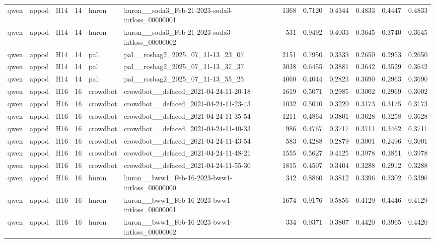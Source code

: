 \begin{table}[tbp]
\begin{tabular}{lllrllrrrrrr}
qwen & appod & H14 & 14 & huron & huron\_\_soda3\_Feb-21-2023-soda3-intloss\_00000001 & 1368 & 0.7120 & 0.4344 & 0.4833 & 0.4447 & 0.4833 \\
qwen & appod & H14 & 14 & huron & huron\_\_soda3\_Feb-21-2023-soda3-intloss\_00000002 & 531 & 0.9492 & 0.4033 & 0.3645 & 0.3740 & 0.3645 \\
qwen & appod & H14 & 14 & pal & pal\_\_rosbag2\_2025\_07\_11-13\_23\_07 & 2151 & 0.7950 & 0.3333 & 0.2650 & 0.2953 & 0.2650 \\
qwen & appod & H14 & 14 & pal & pal\_\_rosbag2\_2025\_07\_11-13\_37\_37 & 3038 & 0.6455 & 0.3881 & 0.3642 & 0.3529 & 0.3642 \\
qwen & appod & H14 & 14 & pal & pal\_\_rosbag2\_2025\_07\_11-13\_55\_25 & 4060 & 0.4044 & 0.2823 & 0.3690 & 0.2963 & 0.3690 \\
qwen & appod & H16 & 16 & crowdbot & crowdbot\_\_defaced\_2021-04-24-11-20-18 & 1619 & 0.5071 & 0.2985 & 0.3002 & 0.2969 & 0.3002 \\
qwen & appod & H16 & 16 & crowdbot & crowdbot\_\_defaced\_2021-04-24-11-23-43 & 1032 & 0.5010 & 0.3220 & 0.3173 & 0.3175 & 0.3173 \\
qwen & appod & H16 & 16 & crowdbot & crowdbot\_\_defaced\_2021-04-24-11-35-54 & 1211 & 0.4864 & 0.3801 & 0.3628 & 0.3258 & 0.3628 \\
qwen & appod & H16 & 16 & crowdbot & crowdbot\_\_defaced\_2021-04-24-11-40-33 & 986 & 0.4767 & 0.3717 & 0.3711 & 0.3462 & 0.3711 \\
qwen & appod & H16 & 16 & crowdbot & crowdbot\_\_defaced\_2021-04-24-11-43-54 & 583 & 0.4288 & 0.2879 & 0.3001 & 0.2496 & 0.3001 \\
qwen & appod & H16 & 16 & crowdbot & crowdbot\_\_defaced\_2021-04-24-11-48-21 & 1555 & 0.5627 & 0.4125 & 0.3978 & 0.3851 & 0.3978 \\
qwen & appod & H16 & 16 & crowdbot & crowdbot\_\_defaced\_2021-04-24-11-55-30 & 1815 & 0.4507 & 0.3404 & 0.3288 & 0.2912 & 0.3288 \\
qwen & appod & H16 & 16 & huron & huron\_\_bww1\_Feb-16-2023-bww1-intloss\_00000000 & 342 & 0.8860 & 0.3812 & 0.3396 & 0.3302 & 0.3396 \\
qwen & appod & H16 & 16 & huron & huron\_\_bww1\_Feb-16-2023-bww1-intloss\_00000001 & 1674 & 0.9176 & 0.5856 & 0.4129 & 0.4446 & 0.4129 \\
qwen & appod & H16 & 16 & huron & huron\_\_bww1\_Feb-16-2023-bww1-intloss\_00000002 & 334 & 0.9371 & 0.3807 & 0.4420 & 0.3965 & 0.4420 \\

\end{tabular}
\end{table}
